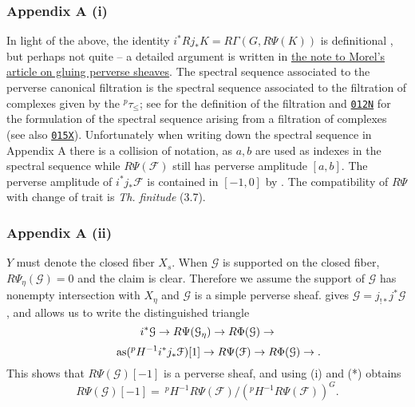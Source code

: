 \documentclass[deligne.tex]{subfiles}
\begin{document}
\subsubsection*{Appendix A (i)}
In light of the above, the identity $i^*Rj_*K=R\Gamma(G,R\Psi(K))$ is 
definitional \cite[3.1.3]{Illusie}, but perhaps not quite – a detailed 
argument is written in
\hyperref[morel]{the note to Morel's article on gluing perverse sheaves}.
The spectral sequence associated to the
perverse canonical filtration is the spectral sequence associated to
the filtration of complexes given by the $^p\tau_{\leq}$; see
\cite[\S3.1.5]{BBD} for the definition of the filtration and
\href{https://stacks.math.columbia.edu/tag/012N}{\texttt{012N}}
for the formulation of the spectral sequence arising from a filtration of
complexes (see also
\href{https://stacks.math.columbia.edu/tag/015X}{\texttt{015X}}). 
Unfortunately when writing down the spectral sequence in
Appendix A there is a collision of notation, as $a,b$ are
used as indexes in the spectral sequence while $R\Psi(\mathcal F)$ still 
has perverse amplitude $[a,b]$.
The perverse amplitude of $i^*j_*\mathcal F$ is contained in $[-1,0]$ by
\cite[4.1.10 (ii)]{BBD}. The compatibility of $R\Psi$ with change of trait
is \emph{Th. finitude} (3.7).

\subsubsection*{Appendix A (ii)}
$Y$ must denote the closed fiber $X_s$. When $\mathcal G$ is supported on
the closed fiber, $R\Psi_\eta(\mathcal G)=0$ and the claim is clear.
Therefore we assume the support of $\mathcal G$ has nonempty intersection 
with $X_\eta$ and $\mathcal G$ is a simple perverse sheaf.
\cite[4.3.1 \& 4.3.2]{BBD} gives $\mathcal G=j_{!*}j^*\mathcal G$, and
\cite[4.1.12]{BBD} allows us to write the distinguished triangle
\begin{equation*}
	i^*\mathcal G\rightarrow R\Psi(\mathcal G_\eta)\rightarrow R\Phi(\mathcal G)\rightarrow
\end{equation*}
\leqnomode
\begin{equation*}\tag*{as}
	(^pH^{-1}i^*j_*\mathcal F)[1]\rightarrow R\Psi(\mathcal F)\rightarrow R\Phi(\mathcal G)\rightarrow.
\end{equation*}
\reqnomode
This shows that $R\Psi(\mathcal G)[-1]$ is a perverse sheaf, and using
(i) and (*) obtains
\begin{equation*}
	R\Psi(\mathcal G)[-1]
	=\ ^pH^{-1}R\Psi(\mathcal F)/(^pH^{-1}R\Psi(\mathcal F))^G.
\end{equation*}
\end{document}
